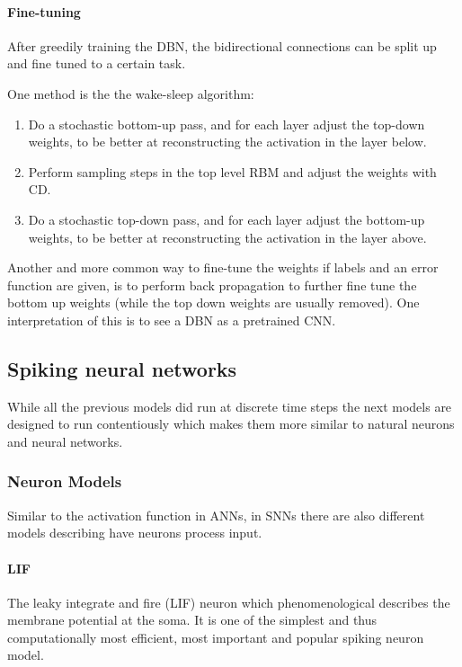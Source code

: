 \paragraph{Fine-tuning}

After greedily training the DBN, the bidirectional connections can be split up and fine tuned to a certain task.

One method is the the wake-sleep algorithm:
\begin{enumerate}
\item Do a stochastic bottom-up pass, and for each layer adjust the top-down weights, to be better at reconstructing the activation in the layer below.
\item Perform sampling steps in the top level RBM and adjust the weights with CD.
\item Do a stochastic top-down pass, and for each layer adjust the bottom-up weights, to be better at reconstructing the activation in the layer above.
\end{enumerate}

Another and more common way to fine-tune the weights if labels and an error function are given, is to perform back propagation to further fine tune the bottom up weights (while the top down weights are usually removed). 
One interpretation of this is to see a DBN as a pretrained CNN.

\subsection{Spiking neural networks}

While all the previous models did run at discrete time steps the next models are designed to run contentiously which makes them more similar to natural neurons and neural networks. 

\subsubsection{Neuron Models}

Similar to the activation function in ANNs, in SNNs there are also different models describing have neurons process input.

\paragraph{LIF}

The leaky integrate and fire (LIF) neuron which phenomenological describes the membrane potential at the soma. 
It is one of the simplest and thus computationally most efficient, most important and popular spiking neuron model.  

